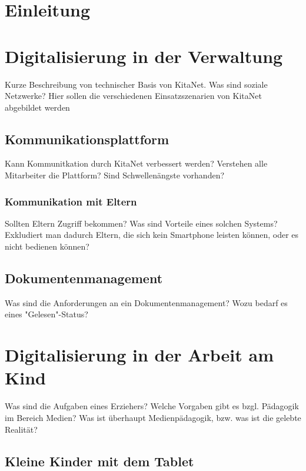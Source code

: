 

\chapter{Einleitung}
\label{sec:Einleitung}

\blindtext


\chapter{Digitalisierung in der Verwaltung}

Kurze Beschreibung von technischer Basis von KitaNet. Was sind soziale Netzwerke?
Hier sollen die verschiedenen Einsatzszenarien von KitaNet abgebildet werden

\section{Kommunikationsplattform}
Kann Kommunitkation durch KitaNet verbessert werden? Verstehen alle Mitarbeiter die Plattform?
Sind Schwellenängste vorhanden?

\subsection{Kommunikation mit Eltern}
Sollten Eltern Zugriff bekommen? Was sind Vorteile eines solchen Systems? Exkludiert man dadurch Eltern, die sich kein Smartphone leisten können, oder es nicht bedienen können?

\section{Dokumentenmanagement}

Was sind die Anforderungen an ein Dokumentenmanagement? 
Wozu bedarf es eines "Gelesen"-Status? 

\chapter{Digitalisierung in der Arbeit am Kind}

Was sind die Aufgaben eines Erziehers? Welche Vorgaben gibt es bzgl. Pädagogik im Bereich Medien?
Was ist überhaupt Medienpädagogik, bzw. was ist die gelebte Realität?

\section{Kleine Kinder mit dem Tablet}

